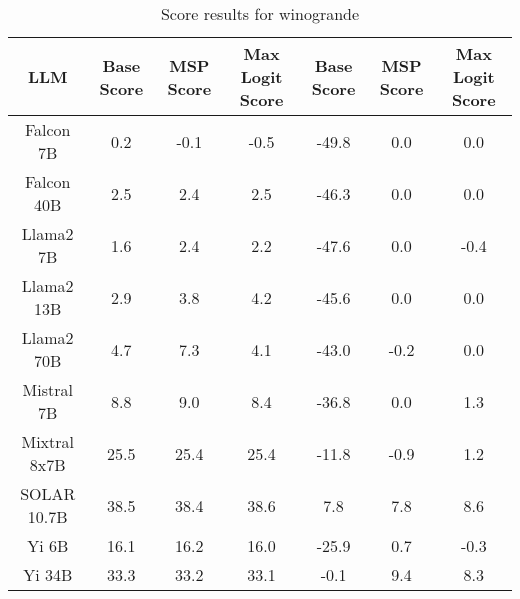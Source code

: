 \renewcommand\arraystretch{1.2}
\begin{table*}
\centering
\begin{tabular}{c|c|c|c|c|c|c}
LLM & Base Score & MSP Score & Max Logit Score & Base Score & MSP Score & Max Logit Score\\ \hline
Falcon 7B & 0.2 & -0.1 & -0.5 & -49.8 & 0.0 & 0.0\\
Falcon 40B & 2.5 & 2.4 & 2.5 & -46.3 & 0.0 & 0.0\\
Llama2 7B & 1.6 & 2.4 & 2.2 & -47.6 & 0.0 & -0.4\\
Llama2 13B & 2.9 & 3.8 & 4.2 & -45.6 & 0.0 & 0.0\\
Llama2 70B & 4.7 & 7.3 & 4.1 & -43.0 & -0.2 & 0.0\\
Mistral 7B & 8.8 & 9.0 & 8.4 & -36.8 & 0.0 & 1.3\\
Mixtral 8x7B & 25.5 & 25.4 & 25.4 & -11.8 & -0.9 & 1.2\\
SOLAR 10.7B & 38.5 & 38.4 & 38.6 & 7.8 & 7.8 & 8.6\\
Yi 6B & 16.1 & 16.2 & 16.0 & -25.9 & 0.7 & -0.3\\
Yi 34B & 33.3 & 33.2 & 33.1 & -0.1 & 9.4 & 8.3\\
\hline
\end{tabular}
\caption{Score results for winogrande}
\end{table*}
\label{tab:winogrande_score}
